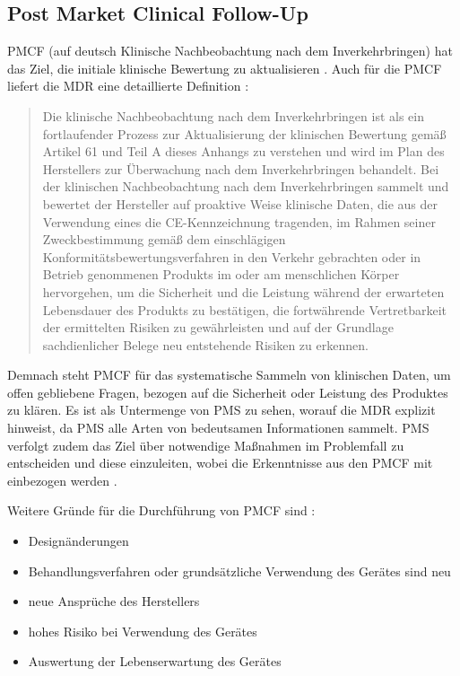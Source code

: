 \documentclass[a4paper,12pt]{report}
\begin{document}
\subsection{Post Market Clinical Follow-Up}\label{subsec:PMCF}
\ac{PMCF} (auf deutsch Klinische Nachbeobachtung nach dem Inverkehrbringen) hat das Ziel, die initiale klinische Bewertung zu aktualisieren \citep[vgl.][S. 286]{Abuhav2012}. Auch für die \ac{PMCF} liefert die \ac{MDR} eine detaillierte Definition \citep[Anhang XIV Teil A 5.]{MDR2017}:
\begin{quote}
Die klinische Nachbeobachtung nach dem Inverkehrbringen ist als ein fortlaufender Prozess zur Aktualisierung der klinischen Bewertung gemäß Artikel 61 und Teil A dieses Anhangs zu verstehen und wird im Plan des Herstellers zur Überwachung nach dem Inverkehrbringen behandelt. Bei der klinischen Nachbeobachtung nach dem Inverkehrbringen sammelt und bewertet der Hersteller auf proaktive Weise klinische Daten, die aus der Verwendung eines die CE-Kennzeichnung tragenden, im Rahmen seiner Zweckbestimmung gemäß dem einschlägigen Konformitätsbewertungsverfahren in den Verkehr gebrachten oder in Betrieb genommenen Produkts im oder am menschlichen Körper hervorgehen, um die Sicherheit und die Leistung während der erwarteten Lebensdauer des Produkts zu bestätigen, die fortwährende Vertretbarkeit der ermittelten Risiken zu gewährleisten und auf der Grundlage sachdienlicher Belege neu entstehende Risiken zu erkennen.
\end{quote}

Demnach steht PMCF für das systematische Sammeln von klinischen Daten, um offen gebliebene Fragen, bezogen auf die Sicherheit oder Leistung des Produktes zu klären. Es ist als Untermenge von PMS zu sehen, worauf die MDR explizit hinweist, da PMS alle Arten von bedeutsamen Informationen sammelt. PMS verfolgt zudem das Ziel über notwendige Maßnahmen im Problemfall zu entscheiden und diese einzuleiten, wobei die Erkenntnisse aus den PMCF mit einbezogen werden \citep[vgl.][]{Johner2017}.

Weitere Gründe für die Durchführung von PMCF sind \citep[vgl.][S. 287]{Abuhav2012}:
\begin{itemize}
\item Designänderungen
\item Behandlungsverfahren oder grundsätzliche Verwendung des Gerätes sind neu
\item neue Ansprüche des Herstellers
\item hohes Risiko bei Verwendung des Gerätes
\item Auswertung der Lebenserwartung des Gerätes
\end{itemize}
\end{document}
